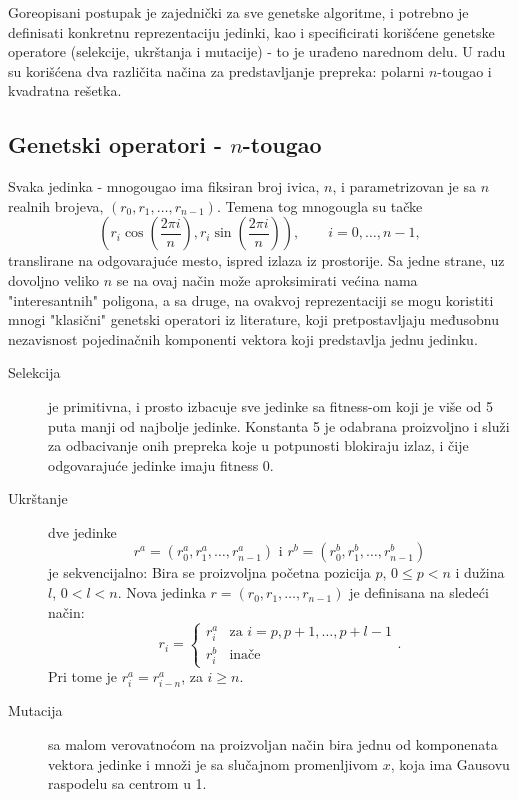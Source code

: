\documentclass[12pt]{article}
\begin{document}
Goreopisani postupak je zajednički za sve genetske algoritme, i potrebno je definisati konkretnu reprezentaciju jedinki, kao i specificirati korišćene genetske operatore (selekcije, ukrštanja i mutacije) - to je urađeno narednom delu. U radu su korišćena dva različita načina za predstavljanje prepreka: polarni $n$-tougao i kvadratna rešetka.

\subsection{Genetski operatori - $n$-tougao}

Svaka jedinka - mnogougao ima fiksiran broj ivica, $n$, i parametrizovan je sa $n$ realnih brojeva, $(r_0, r_1, \dots, r_{n-1})$. Temena tog mnogougla su tačke
$$\left(r_i \cos\left(\frac{2\pi i}{n}\right), r_i \sin\left(\frac{2\pi i}{n}\right)\right), \qquad i=0,\dots,n-1,$$
translirane na odgovarajuće mesto, ispred izlaza iz prostorije. Sa jedne strane, uz dovoljno veliko $n$ se na ovaj način može aproksimirati većina nama "interesantnih" poligona, a sa druge, na ovakvoj reprezentaciji se mogu koristiti mnogi "klasični" genetski operatori iz literature, koji pretpostavljaju međusobnu nezavisnost pojedinačnih komponenti vektora koji predstavlja jednu jedinku.

\begin{description}
\item[Selekcija] je primitivna, i prosto izbacuje sve jedinke sa fitness-om koji je više od 5 puta manji od najbolje jedinke. Konstanta 5 je odabrana proizvoljno i služi za odbacivanje onih prepreka koje u potpunosti blokiraju izlaz, i čije odgovarajuće jedinke imaju fitness 0.
\item[Ukrštanje] dve jedinke 
$$r^a = (r^a_0, r^a_1, \dots, r^a_{n-1}) \text{ i } r^b=(r^b_0, r^b_1, \dots, r^b_{n-1})$$ je sekvencijalno: Bira se proizvoljna početna pozicija $p$, $0\leq p < n$ i dužina $l$, $0 < l < n $. Nova jedinka $r = (r_0, r_1, \dots, r_{n-1})$ je definisana na sledeći način:
$$
r_i = 
\begin{cases}
    r^a_i & \text{za } i=p, p+1, \dots, p+l-1\\
    r^b_i & \text{inače}
\end{cases}.
$$
Pri tome je $r^a_i = r^a_{i-n}$, za $i\geq n$.
\item[Mutacija] sa malom verovatnoćom na proizvoljan način bira jednu od komponenata vektora jedinke i množi je sa slučajnom promenljivom $x$, koja ima Gausovu raspodelu sa centrom u 1.
\end{description}
\end{document}
